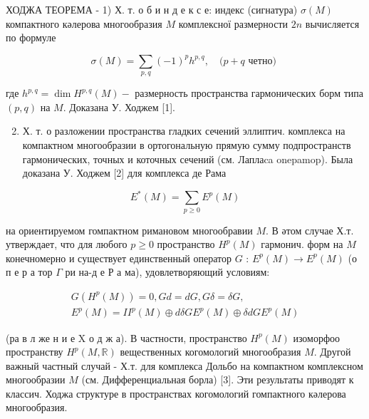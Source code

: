 \documentclass[10pt]{article}
\begin{document}
ХОДЖА ТЕОРЕМА - 1) Х. т. о б и н д е к с е: индекс (сигнатура) $\sigma(M)$ компактного кәлерова многообразия $M$ комплексної размерности $2 n$ вычисляется по формуле



\[

\sigma(M)=\sum_{p, q}(-1)^{p} h^{p, q}, \quad(p+q \text { четно) }

\]



где $h^{p, q}=\operatorname{dim} H^{p, q}(M)-$ размерность пространства гармонических борм типа $(p, q)$ на $M$. Доказана У. Ходжем [1].



\begin{enumerate}

  \setcounter{enumi}{1}

  \item Х. т. о разложении пространства гладких сечений эллиптич. комплекса на компактном многообразии в ортогональную прямую сумму подпространств гармонических, точных и коточных сечений (см. Лаплаca onepamop). Была доказана У. Ходжем [2] для комплекса де Рама

\end{enumerate}



\[

E^{*}(M)=\sum_{p \geqslant 0} E^{p}(M)

\]



на ориентируемом гомпактном римановом многообравии $M$. В әтом случае Х.т. утверждает, что для любого $p \geqslant 0$ пространство $H^{p}(M)$ гармонич. форм на $M$ конечномерно и существует единственный оператор $G$ : $E^{p}(M) \longrightarrow E^{p}(M)$ (о п е р а тор $\Gamma$ ри на-д е Р а ма), удовлетворяющий условиям:



\[

\begin{gathered}

G\left(H^{p}(M)\right)=0, G d=d G, G \delta=\delta G, \\

E^{p}(M)=I I^{p}(M) \oplus d \delta G E^{p}(M) \oplus \delta d G E^{p}(M)

\end{gathered}

\]



(ра в л же н и е $\mathrm{X}$ о д ж а). В частности, пространство $H^{p}(M)$ изоморфоо пространству $H^{p}(M, \mathbb{R})$ вещественных когомологий многообразия $M$. Другой важный частный случай - Х.т. для комплекса Дольбо на компактном комплексном многообразии $M$ (см. Дифференциальная борла) [3]. Эти результаты приводят к классич. Ходжа структуре в пространствах когомологий гомпактного кәлерова многообразия.
\end{document}
